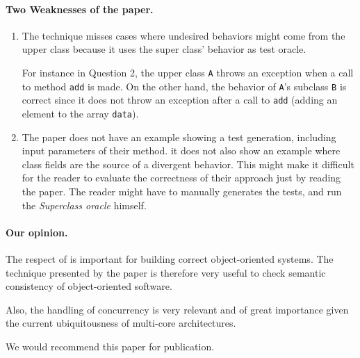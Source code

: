 \paragraph{Two Weaknesses of the paper.}
\begin{enumerate}
\item The technique misses cases where undesired behaviors
might come from the upper class because it uses the super class'
behavior as test oracle.

For instance in Question 2, the upper class \texttt{A} throws
an exception when a call to method \texttt{add} is made. On the
other hand, the behavior of \texttt{A}'s subclass \texttt{B}
is correct since it does not throw an exception after a call
to \texttt{add} (adding an element to the array \texttt{data}).

\item The paper does not have an example showing a test generation,
including input parameters of their method. 
it does not also show an example where class fields are the source
of a divergent behavior.
This might make it difficult for the reader to evaluate the correctness
of their approach just by reading the paper. The reader might have
to manually generates the tests, and run the
\textit{Superclass oracle} himself.

\end{enumerate}

\paragraph{Our opinion.}
The respect of \mysub{} is important for building correct
object-oriented systems. The technique presented by the paper
is therefore very useful to check semantic consistency of
object-oriented software.

Also, the handling of concurrency is very relevant and of great
importance given the current ubiquitousness of multi-core
architectures.

We would recommend this paper for publication.